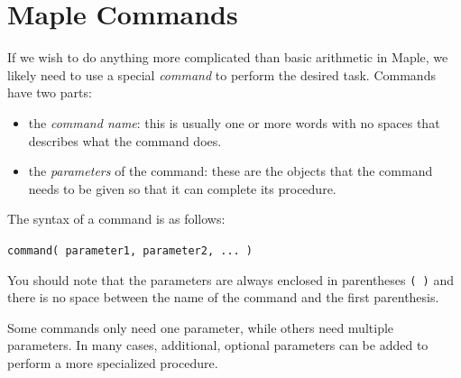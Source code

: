 \begin{maplegroup}
\begin{mapleinput}
\end{mapleinput}
\mapleresult
\begin{maplelatex}
\end{maplelatex}
\end{maplegroup}

\begin{maplegroup}
\begin{mapleinput}
\end{mapleinput}
\mapleresult
\begin{maplelatex}
\end{maplelatex}
\end{maplegroup}

\section{Maple Commands}
\label{sec:maple_commands}

If we wish to do anything more complicated than basic arithmetic in Maple, we likely need to use a special \textit{command} to perform the desired task. Commands have two parts:
\begin{itemize}
\item the \textit{command name}: this is usually one or more words with no spaces that describes what the command does.
\item the \textit{parameters} of the command: these are the objects that the command needs to be given so that it can complete its procedure.
\end{itemize}
The syntax of a command is as follows:
\begin{center}
\texttt{command( parameter1, parameter2, ... )}
\end{center}
You should note that the parameters are always enclosed in parentheses \texttt{( )} and there is no space between the name of the command and the first parenthesis. 

Some commands only need one parameter, while others need multiple parameters. In many cases, additional, optional parameters can be added to perform a more specialized procedure.

